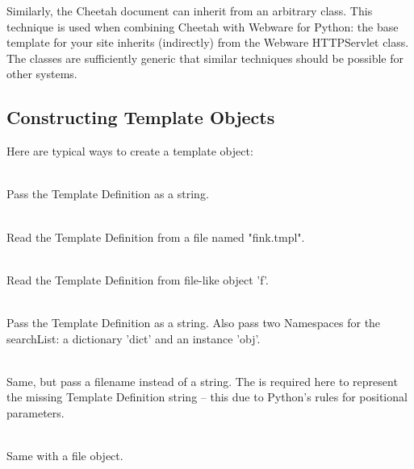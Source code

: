 Similarly, the Cheetah document can inherit from an arbitrary class. This
technique is used when combining Cheetah with Webware for Python: the base
template for your site inherits (indirectly) from the Webware HTTPServlet class.
The classes are sufficiently generic that similar techniques should be possible
for other systems.

\subsection{Constructing Template Objects}
\label{howWorks.constructing}


Here are typical ways to create a template object:
\begin{description}
\item{}
     \\ Pass the Template Definition as a string.
\item{}
     \\ Read the Template Definition from a file named "fink.tmpl".  
\item{}
     \\ Read the Template Definition from file-like object 'f'.
\item{}
     \\ Pass the Template Definition as a string.  Also pass two Namespaces for
     the searchList: a dictionary 'dict' and an instance 'obj'.
\item{}
     \\ Same, but pass a filename instead of a string.  The  is
     required here to represent the missing Template Definition string -- this
     due to Python's rules for positional parameters.
\item{}
     \\ Same with a file object.
\end{description}

